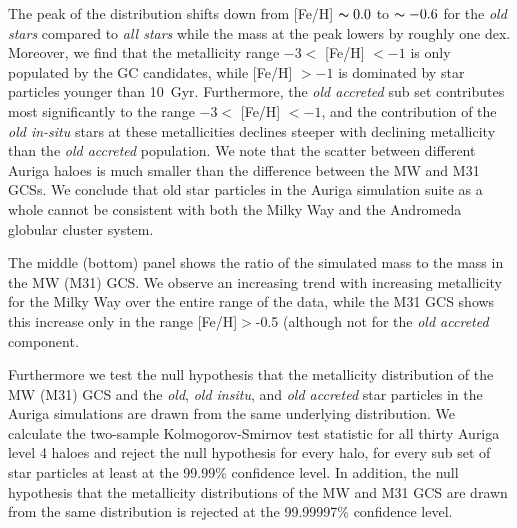 \documentclass[a4paper,fleqn,usenatbib]{mnras}
\begin{document}
The peak of the distribution shifts down from [Fe/H] $\thicksim 0.0$ to 
$\thicksim -0.6$ for the \emph{old stars} compared to \emph{all stars} while the 
mass at the peak lowers by roughly one dex. Moreover, we find that the 
metallicity range $-3 <$ [Fe/H] $< -1$ is only populated by the GC candidates, 
while [Fe/H] $> -1$ is dominated by star particles younger than 10~Gyr.
Furthermore, the \emph{old accreted} sub set contributes most significantly to 
the range $-3 <$ [Fe/H] $< -1$, and the contribution of the \emph{old in-situ}
stars at these metallicities declines steeper with declining metallicity 
than the \emph{old accreted} population. We note that the scatter between different
Auriga haloes is much smaller than the difference between the MW and M31 GCSs.
We conclude that old star particles in the Auriga simulation suite as a whole 
cannot be consistent with both the Milky Way and the Andromeda globular cluster
system.

The middle (bottom) panel shows the ratio of the simulated mass to the mass in
the MW (M31) GCS. We observe an increasing trend with increasing metallicity 
for the Milky Way over the entire range of the data, while the M31 GCS shows
this increase only in the range [Fe/H]$>$-0.5 (although not for the \emph{old
accreted} component.


Furthermore we test the null hypothesis that the metallicity distribution of the
MW (M31) GCS and the \emph{old}, \emph{old insitu}, and \emph{old accreted} star 
particles in the Auriga simulations are drawn from the same underlying 
distribution. We calculate the two-sample Kolmogorov-Smirnov test statistic for
all thirty Auriga level 4 haloes and reject the null hypothesis for every halo, 
for every sub set of star particles at least at the 99.99\% confidence level.
In addition, the null hypothesis that the metallicity distributions of the MW 
and M31 GCS are drawn from the same distribution is rejected at the 99.99997\%
confidence level.
\end{document}
